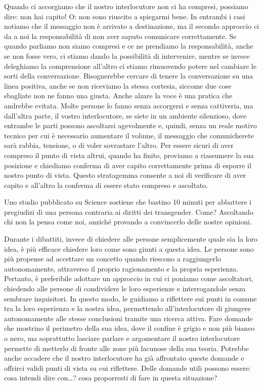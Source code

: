\documentclass[12pt]{book} %
\begin{document}
Quando ci accorgiamo che il nostro interlocutore non ci ha
compresi, possiamo dire: non hai capito! O: non sono riuscito a spiegarmi bene. In entrambi i casi notiamo che il
messaggio non è arrivato a destinazione, ma il secondo approccio ci da a noi la responsabilità di non aver saputo
comunicare correttamente. Se quando parliamo non siamo compresi e ce ne prendiamo la responsabilità, anche se non fosse
vero, ci stiamo dando la possibilità di intervenire, mentre se invece deleghiamo la comprensione
all'altro ci stiamo rimuovendo potere nel cambiare le sorti della conversazione. Bisognerebbe
cercare di tenere la conversazione su una linea positiva, anche se non riceviamo la stessa cortesia, siccome due cose
sbagliate non ne fanno una giusta. Anche alzare la voce è una pratica che andrebbe evitata. Molte persone lo fanno
senza accorgersi e senza cattiveria, ma dall'altra parte, il vostro interlocutore, se siete in un
ambiente silenzioso, dove entrambe le parti possono ascoltarsi agevolmente e, quindi, senza un reale motivo tecnico per
cui è necessario aumentare il volume, il messaggio che comunicherete sarà rabbia, tensione, o di voler sovrastare
l'altro. Per essere sicuri di aver compreso il punto di vista altrui, quando ha finito, proviamo a
riassumere la sua posizione e chiediamo conferma di aver capito correttamente prima di esporre il nostro punto di
vista. Questo stratagemma consente a noi di verificare di aver capito e all'altro la conferma di
essere stato compreso e ascoltato.

Uno studio pubblicato su Science sostiene che
bastino 10 minuti per abbattere i pregiudizi di una persona contraria ai diritti dei transgender. Come? Ascoltando chi
non la pensa come noi, anziché provando a convincerlo delle nostre opinioni.

Durante i dibattiti, invece di chiedere alle persone semplicemente quale sia la loro idea, è più efficace chiedere loro
come sono giunti a questa idea. Le persone sono più propense ad accettare un concetto quando riescono a raggiungerlo
autonomamente, attraverso il proprio ragionamento e la propria esperienza. Pertanto, è preferibile adottare un
approccio in cui ci poniamo come ascoltatori, chiedendo alle persone di condividere le loro esperienze e interrogandole
senza sembrare inquisitori. In questo modo, le guidiamo a riflettere sui punti in comune tra la loro esperienza e la
nostra idea, permettendo all'interlocutore di giungere autonomamente alle stesse conclusioni tramite una ricerca
attiva. Fare domande che mostrino il perimetro della sua idea, dove il confine è grigio e non più bianco o nero, ma
soprattutto lasciare parlare e argomentare il nostro interlocutore permette di metterlo di fronte alle zone più
lacunose della sua teoria. Potrebbe anche accadere che il
nostro interlocutore ha già affrontato queste domande e offrirci validi punti di vista su cui riflettere. Delle domande
utili possono essere: cosa intendi dire con…? cosa proporresti di fare in questa situazione?
\end{document}

